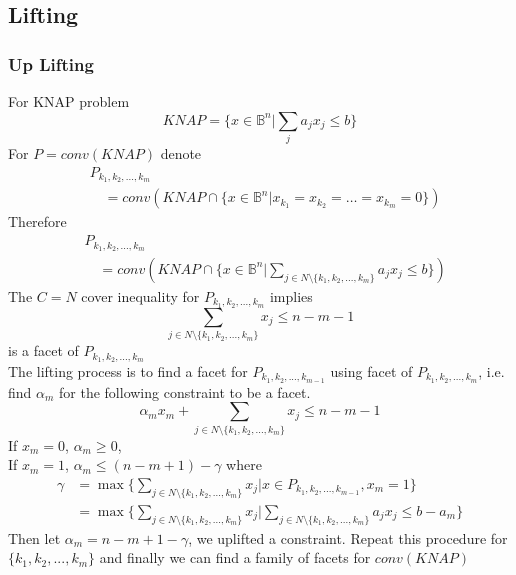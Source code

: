 			\subsection{Lifting}
				\subsubsection{Up Lifting}
					For KNAP problem
					\begin{equation}
						KNAP = \{x\in \mathbb{B}^n | \sum_j a_jx_j \le b\} 
					\end{equation}
					For $P=conv(KNAP)$ denote\\
					\begin{align}
						&P_{k_1, k_2, ..., k_m} \\
						&\quad =conv(KNAP\cap \{x\in \mathbb{B}^{n}|x_{k_1}=x_{k_2}=\dots=x_{k_m}=0\}) 
					\end{align}
					Therefore
					\begin{align}
						&P_{k_1, k_2, ..., k_m} \\
						&\quad=conv(KNAP\cap \{x\in \mathbb{B}^{n}|\sum_{j\in N\setminus \{k_1, k_2, ..., k_m\}} a_j x_j \le b\}) 
					\end{align}
					The $C=N$ cover inequality for $P_{k_1, k_2, ..., k_m}$ implies
					\begin{equation}
						\sum_{j\in N\setminus \{k_1, k_2, ..., k_m\}} x_j \le n-m-1 
					\end{equation}
					is a facet of $P_{k_1, k_2, ..., k_m}$\\
					The lifting process is to find a facet for $P_{k_1, k_2, ..., k_{m-1}}$ using facet of $P_{k_1, k_2, ..., k_m}$, i.e. find $\alpha_{m}$ for the following constraint to be a facet.
					\begin{equation}
						\alpha_m x_m + \sum_{j\in N\setminus \{k_1, k_2, ..., k_m\}} x_j \le n-m-1 
					\end{equation}
					If $x_m=0$, $\alpha_m \ge 0$,\\
					If $x_m=1$, $\alpha_m \le (n-m+1) - \gamma$ where
					\begin{align}
						\gamma &= \max\{\sum_{j\in N\setminus\{k_1, k_2, ..., k_m\}}x_j|x\in P_{k_1, k_2, ..., k_{m-1}}, x_m=1\} \\
						&= \max\{\sum_{j\in N\setminus\{k_1, k_2, ..., k_m\}}x_j|\sum_{j \in N \setminus \{k_1, k_2, ..., k_m\}}a_jx_j\le b-a_m\} 
					\end{align}
					Then let $\alpha_m = n-m+1-\gamma$, we uplifted a constraint. Repeat this procedure for $\{k_1, k_2, ..., k_m\}$ and finally we can find a family of facets for $conv(KNAP)$


